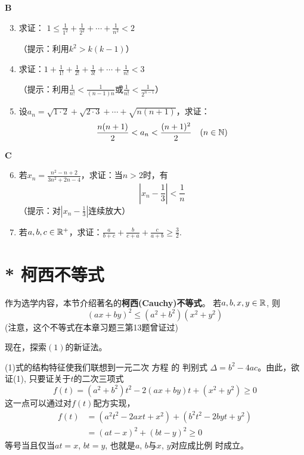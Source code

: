 \begin{center}
    \bfseries B
\end{center}


\begin{enumerate}\setcounter{enumi}{2}
    \item 求证： $1\le \frac{1}{1^2}+ \frac{1}{2^2}+\cdots + \frac{1}{n^2}<2$
    
（提示：利用$k^2>k(k-1)$）

\item 求证：$1+\frac{1}{1!}+\frac{1}{2!}+\frac{1}{3!}+\cdots+\frac{1}{n!}<3$

（提示：利用$\frac{1}{n!}<\frac{1}{(n-1)n}$或$\frac{1}{n!}<\frac{1}{2^{n-1}}$）

\item 设$a_n=\sqrt{1\cdot 2}+\sqrt{2\cdot 3}+\cdots +\sqrt{n(n+1)}$，求证：
\[\dfrac{n(n+1)}{2}<a_n<\dfrac{(n+1)^2}{2}\quad (n\in\mathbb{N})\]
\end{enumerate}

\begin{center}
    \bfseries C
\end{center}


\begin{enumerate}\setcounter{enumi}{5}
\item 若$x_n=\frac{n^2-n+2}{3n^2+2n-4}$，求证：当$n>2$时，有
\[\left|x_n-\frac{1}{3}\right|<\frac{1}{n}\]
（提示：对$|x_n-\tfrac{1}{3}|$连续放大）

\item 若$a,b,c\in\mathbb{R}^+$，求证：$\frac{a}{b+c}+\frac{b}{c+a}+\frac{c}{a+b}\ge \frac{3}{2}$.
\end{enumerate}

\section{* 柯西不等式}

作为选学内容，本节介绍著名的\textbf{柯西(Cauchy)不等式}。
若$a,b,x,y\in \mathbb{R}$, 则
\begin{equation}
    (ax+by)^2\le (a^2+b^2)(x^2+y^2)  \tag{1}
\end{equation}
(注意，这个不等式在本章习题三第13题曾证过)

现在，探索$(1)的新证法$。

(1)式的结构特征使我们联想到一元二次 方程 的 判别式
$\Delta=b^2-4ac$。由此，欲证(1), 只要证关于$t$的二次三项式
$$f(t)=(a^2+b^2)t^2-2(ax+by)t+(x^2+y^2)\ge 0$$
这一点可以通过对$f(t)$配方实现，
\[\begin{split}
    f(t)&=(a^{2}t^{2}-2axt+x^{2})+(b^{2}t^{2}-2byt+y^{2})\\
    &=(at-x)^{2}+(bt-y)^{2}\ge 0
\end{split}\]
等号当且仅当$at=x$, $bt=y$, 也就是$a$, $b$与$x$, $y$对应成比例
时成立。

